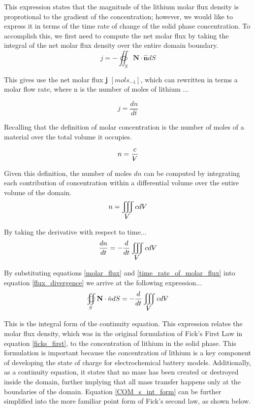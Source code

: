 \documentclass[lettersize,journal]{IEEEtran}
\newcommand{\volume}{{\ooalign{\hfil$V$\hfil\cr\kern0.08em--\hfil\cr}}}
\begin{document}
This expression states that the magnitude of the lithium molar flux density is proprotional to the gradient of the concentration; however, we would like to express it in terms of the time rate of change of the solid phase concentration. To accomplish this, we first need to compute the net molar flux by taking the integral of the net molar flux density over the entire domain boundary.
\begin{equation}\label{flux_divergence}
  j = -\oiint_{S} \textbf{N} \cdot \hat{\textbf{n}}dS
\end{equation}

This gives use the net molar flux \textbf{j} $ [mols_{-1}]$, which can rewritten in terms a molar flow rate, where n is the number of moles of lithium ...

\begin{equation}\label{molar_flux}
    j = \frac{dn}{dt}
\end{equation}

Recalling that the definition of molar concentration is the number of moles of a material over the total volume it occupies.

\begin{equation}
    n = \frac{c}{\volume}
\end{equation}

Given this definition, the number of moles $dn$ can be computed by integrating each contribution of concentration within a differential volume over the entire volume of the domain.
\begin{equation}
    n = \iiint_{\volume} cd{\volume}
\end{equation}

\noindent By taking the derivative with respect to time...
\begin{equation}\label{time_rate_of_molar_flux}
  \frac{dn}{dt} = -\frac{d}{dt} \iiint_{\volume} cd{\volume}
\end{equation}

\noindent By substituting equations \ref{molar_flux} and \ref{time_rate_of_molar_flux} into equation \ref{flux_divergence} we arrive at the following expression...
\begin{equation}\label{COM_s_int_form}
  \oiint_S \textbf{N} \cdot \hat{n}dS = -\frac{d}{dt} \iiint_{\volume} c d{\volume}
\end{equation}

This is the integral form of the continuity equation. This expression relates the molar flux density, which was in the original formulation of Fick's First Law in equation \ref{ficks_first}, to the concentration of lithium in the solid phase. This formulation is important because the concentration of lithium is a key component of developing the state of charge for electrochemical battery models. Additionally, as a continuity equation, it states that no mass has been created or destroyed inside the domain, further implying that all mass transfer happens only at the boundaries of the domain. Equation \ref{COM_s_int_form} can be further simplified into the more familiar point form of Fick's second law, as shown below.
\end{document}
